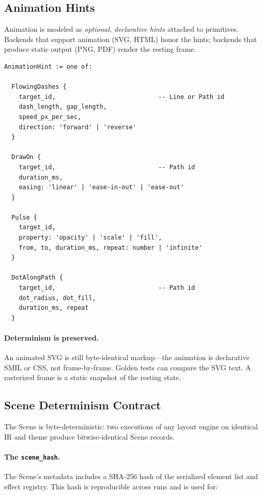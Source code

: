 \subsection{Animation Hints}
\label{sec:scene-animation}

Animation is modeled as \emph{optional, declarative hints} attached to primitives. Backends that support animation (SVG, HTML) honor the hints; backends that produce static output (PNG, PDF) render the resting frame.

\begin{Verbatim}[frame=single,fontsize=\small]
AnimationHint := one of:

  FlowingDashes {
    target_id,                            -- Line or Path id
    dash_length, gap_length,
    speed_px_per_sec,
    direction: 'forward' | 'reverse'
  }

  DrawOn {
    target_id,                            -- Path id
    duration_ms,
    easing: 'linear' | 'ease-in-out' | 'ease-out'
  }

  Pulse {
    target_id,
    property: 'opacity' | 'scale' | 'fill',
    from, to, duration_ms, repeat: number | 'infinite'
  }

  DotAlongPath {
    target_id,                            -- Path id
    dot_radius, dot_fill,
    duration_ms, repeat
  }
\end{Verbatim}

\paragraph{Determinism is preserved.}
An animated SVG is still byte-identical markup---the animation is declarative SMIL or CSS, not frame-by-frame. Golden tests can compare the SVG text. A rasterized frame is a static snapshot of the resting state.

\subsection{Scene Determinism Contract}
\label{sec:scene-determinism}

The Scene is byte-deterministic: two executions of any layout engine on identical IR and theme produce bitwise-identical Scene records.

\paragraph{The \texttt{scene\_hash}.}
The Scene's metadata includes a SHA-256 hash of the serialized element list and effect registry. This hash is reproducible across runs and is used for:

